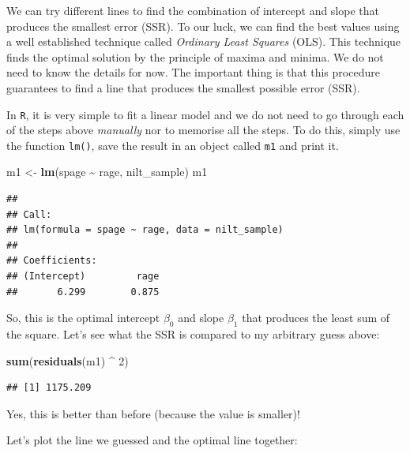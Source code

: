 \documentclass[
]{book}
\newenvironment{Shaded}{\begin{snugshade}}{\end{snugshade}}
\newcommand{\DecValTok}[1]{\textcolor[rgb]{0.00,0.00,0.81}{#1}}
\newcommand{\FunctionTok}[1]{\textcolor[rgb]{0.13,0.29,0.53}{\textbf{#1}}}
\newcommand{\NormalTok}[1]{#1}
\newcommand{\OtherTok}[1]{\textcolor[rgb]{0.56,0.35,0.01}{#1}}
\newcommand{\SpecialCharTok}[1]{\textcolor[rgb]{0.81,0.36,0.00}{\textbf{#1}}}
\begin{document}
We can try different lines to find the combination of intercept and slope that produces the smallest error (SSR). To our luck, we can find the best values using a well established technique called \emph{Ordinary Least Squares} (OLS). This technique finds the optimal solution by the principle of maxima and minima. We do not need to know the details for now. The important thing is that this procedure guarantees to find a line that produces the smallest possible error (SSR).

In \texttt{R}, it is very simple to fit a linear model and we do not need to go through each of the steps above \emph{manually} nor to memorise all the steps. To do this, simply use the function \texttt{lm()}, save the result in an object called \texttt{m1} and print it.

\begin{Shaded}
\begin{Highlighting}[]
\NormalTok{m1 }\OtherTok{\textless{}{-}} \FunctionTok{lm}\NormalTok{(spage }\SpecialCharTok{\textasciitilde{}}\NormalTok{ rage, nilt\_sample)}
\NormalTok{m1}
\end{Highlighting}
\end{Shaded}

\begin{verbatim}
## 
## Call:
## lm(formula = spage ~ rage, data = nilt_sample)
## 
## Coefficients:
## (Intercept)         rage  
##       6.299        0.875
\end{verbatim}

So, this is the optimal intercept \(\beta_0\) and slope \(\beta_1\) that produces the least sum of the square. Let's see what the SSR is compared to my arbitrary guess above:

\begin{Shaded}
\begin{Highlighting}[]
\FunctionTok{sum}\NormalTok{(}\FunctionTok{residuals}\NormalTok{(m1) }\SpecialCharTok{\^{}} \DecValTok{2}\NormalTok{)}
\end{Highlighting}
\end{Shaded}

\begin{verbatim}
## [1] 1175.209
\end{verbatim}

Yes, this is better than before (because the value is smaller)!

Let's plot the line we guessed and the optimal line together:
\end{document}
